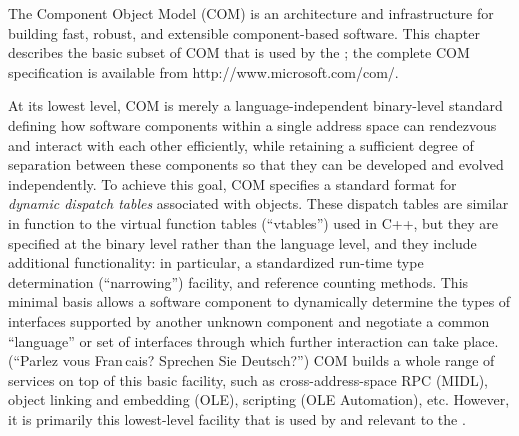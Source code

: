 %
% 
%
\label{com}


The Component Object Model (COM)
is an architecture and infrastructure
for building fast, robust, and extensible component-based software.
This chapter describes the basic subset of COM
that is used by the \oskit{};
the complete COM specification is available from
%
	{http://www.microsoft.com/com/}.

At its lowest level,
COM is merely a language-independent binary-level standard
defining how software components within a single address space
can rendezvous and interact with each other efficiently,
while retaining a sufficient degree of separation between these components
so that they can be developed and evolved independently.
To achieve this goal,
COM specifies a standard format
for \emph{dynamic dispatch tables} associated with objects.
These dispatch tables are similar in function
to the virtual function tables (``vtables'') used in C++,
but they are specified at the binary level rather than the language level,
and they include additional functionality:
in particular,
a standardized run-time type determination (``narrowing'') facility,
and reference counting methods.
This minimal basis allows a software component
to dynamically determine the types of interfaces
supported by another unknown component
and negotiate a common ``language'' or set of interfaces
through which further interaction can take place.
(``Parlez vous Fran\,cais?  Sprechen Sie Deutsch?'')
COM builds a whole range of services
on top of this basic facility,
such as cross-address-space RPC (MIDL),
object linking and embedding (OLE),
scripting (OLE Automation), etc.
However, it is primarily this lowest-level facility
that is used by and relevant to the \oskit.

